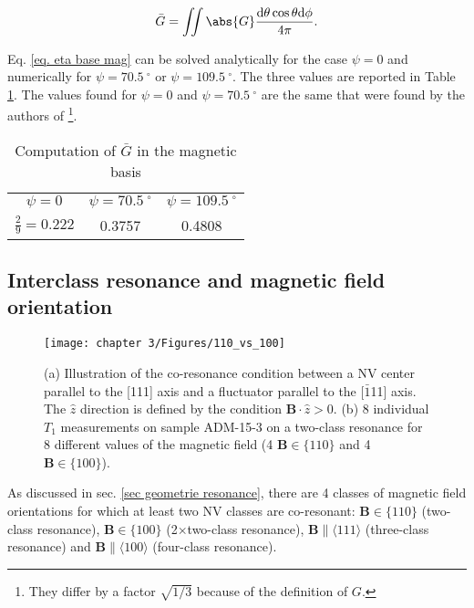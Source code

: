 \documentclass[a4paper, 11pt]{report}
\begin{document}
\begin{equation}
\label{eq. eta base mag}
\bar{G}= \iint \abs{G} \frac{\rm d\theta \cos \theta \rm d\phi}{4 \pi}.
\end{equation}

Eq. \ref{eq. eta base mag} can be solved analytically for the case $\psi=0$ and numerically for $\psi=70.5 \ ^\circ$ or $\psi=109.5 \ ^\circ$. The three values are reported in Table \ref{table G mag}. The values found for $\psi=0$ and $\psi=70.5 \ ^\circ$ are the same that were found by the authors of \citep{choi2017depolarization} \footnote{They differ by a factor $\sqrt{1/3}$ because of the definition of $G$.}.

\begin{table}[htbp]
\centering
\caption{Computation of $\bar G$ in the magnetic basis}
 \label{table G mag}
\begin{tabular}{c|c|c}
\toprule
$\psi=0$ & $\psi=70.5 \ ^\circ$ & $\psi=109.5 \ ^\circ$ \\

$\frac{2}{9}=0.222$ & 0.3757 & 0.4808 \\
\bottomrule
\end{tabular}
\end{table}

\subsection{Interclass resonance and magnetic field orientation}

\begin{figure}[h!]
\centering
\texttt{[image: chapter 3/Figures/110\_vs\_100]}
\caption{(a) Illustration of the co-resonance condition between a NV center parallel to the [111] axis and a fluctuator parallel to the [$\bar 1$11] axis. The $\hat z$ direction is defined by the condition $\mathbf{B}\cdot\hat{z} >0$. (b) 8 individual $T_1$ measurements on sample ADM-15-3 on a two-class resonance for 8 different values of the magnetic field (4 $\mathbf{B} \in \{110\}$ and 4 $\mathbf{B} \in \{100\}$).}
\label{110 vs 100 annexe}
\end{figure}

As discussed in sec. \ref{sec geometrie resonance}, there are 4 classes of magnetic field orientations for which at least two NV classes are co-resonant: $\mathbf{B} \in \{110\}$ (two-class resonance), $\mathbf{B} \in \{100\}$ (2$\times$two-class resonance), $\mathbf{B} \parallel \langle 111 \rangle$ (three-class resonance) and $\mathbf{B} \parallel \langle 100\rangle$ (four-class resonance).
\end{document}

